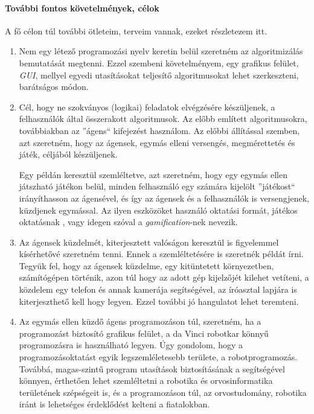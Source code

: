 \documentclass[12pt,a4paper,oneside]{report} %
\begin{document}
\paragraph{További fontos követelmények, célok}
A fő célon túl további ötleteim, terveim vannak, ezeket részletezem itt.
\begin{enumerate}
	\item Nem egy létező programozási nyelv keretin belül szeretném  az algoritmizálás bemutatását megtenni. Ezzel szembeni követelményem, egy grafikus felület, \textit{GUI}, mellyel egyedi utasításokat teljesítő algoritmusokat lehet szerkeszteni, barátságos módon.
	\item Cél, hogy ne szokványos (logikai) feladatok elvégzésére készüljenek, a felhasználók által összerakott algoritmusok. Az előbb említett algoritmusokra, továbbiakban az ''ágens`` kifejezést használom. Az előbbi állítással szemben, azt szeretném, hogy az ágensek,  egymás elleni versengés, megmérettetés és játék, céljából készüljenek.
	\par Egy példán keresztül szemléltetve, azt szeretném, hogy egy egymás ellen játszható játékon belül, minden felhasználó egy számára kijelölt ''játékost`` irányíthasson az ágensével, és így az ágensek és a felhasználók is versengjenek, küzdjenek egymással. Az ilyen eszközöket használó oktatási formát, játékos oktatásnak  \cite{riar2020game}, vagy idegen szóval a \textit{gamification}-nek \cite{Deterding2011} nevezik. 
	\item Az ágensek küzdelmét, kiterjesztett valóságon keresztül is figyelemmel kísérhetővé szeretném tenni. Ennek a szemléltetésére is szeretnék példát írni. Tegyük fel, hogy  az ágensek küzdelme, egy kitüntetett környezetben, számítógépen történik, azon túl hogy az adott gép kijelzőjét kilehet vetíteni, a közdelem egy telefon és annak kamerája segítségével, az íróasztal lapjára is kiterjeszthető kell hogy legyen. Ezzel további jó hangulatot lehet teremteni.
	\item Az egymás ellen küzdő ágens programozáson túl, szeretném, ha a programozást biztosító grafikus felület, a da Vinci robotkar könnyű programozásra is használható legyen. Úgy gondolom, hogy a programozásoktatást egyik legszemléletesebb területe, a robotprogramozás. Továbbá, magas-szintű program utasítások biztosításának a segítségével könnyen, érthetően lehet szemléltetni a robotika és orvosinformatika területének szépségeit is, és a programozáson túl, az orvostudomány, robotika iránt is  lehetséges érdeklődést kelteni a fiatalokban.
\end{enumerate}
\end{document}
